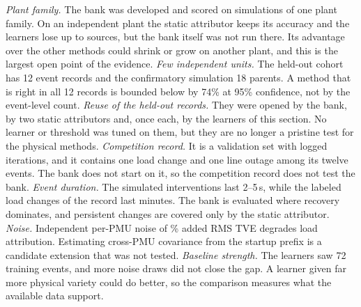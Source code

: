 \emph{Plant family.} The bank was developed and scored on simulations of one plant family. On an independent plant the static attributor keeps its accuracy and the learners lose up to \SPDrop{} sources, but the bank itself was not run there. Its advantage over the other methods could shrink or grow on another plant, and this is the largest open point of the evidence.
\emph{Few independent units.} The held-out cohort has 12 event records and the confirmatory simulation 18 parents. A method that is right in all 12 records is bounded below by 74\% at 95\% confidence, not by the event-level count.
\emph{Reuse of the held-out records.} They were opened by the bank, by two static attributors and, once each, by the learners of this section. No learner or threshold was tuned on them, but they are no longer a pristine test for the physical methods.
\emph{Competition record.} It is a validation set with logged iterations, and it contains one load change and one line outage among its twelve events. The bank does not start on it, so the competition record does not test the bank.
\emph{Event duration.} The simulated interventions last 2--5\,s, while the labeled load changes of the record last minutes. The bank is evaluated where recovery dominates, and persistent changes are covered only by the static attributor.
\emph{Noise.} Independent per-PMU noise of \RevNoiseAddedRmsLow{}\% added RMS TVE degrades load attribution. Estimating cross-PMU covariance from the startup prefix is a candidate extension that was not tested.
\emph{Baseline strength.} The learners saw 72 training events, and more noise draws did not close the gap. A learner given far more physical variety could do better, so the comparison measures what the available data support.
